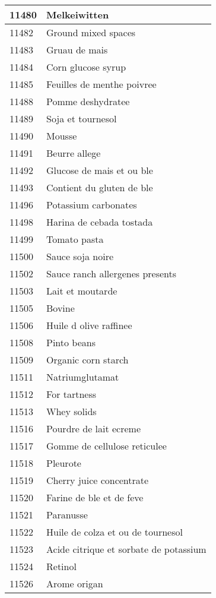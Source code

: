 \begin{longtable}{|l|l|}
11480 & Melkeiwitten \\ \hline 
11482 & Ground mixed spaces \\ \hline 
11483 & Gruau de mais \\ \hline 
11484 & Corn glucose syrup \\ \hline 
11485 & Feuilles de menthe poivree \\ \hline 
11488 & Pomme deshydratee \\ \hline 
11489 & Soja et tournesol \\ \hline 
11490 & Mousse \\ \hline 
11491 & Beurre allege \\ \hline 
11492 & Glucose de mais et ou ble \\ \hline 
11493 & Contient du gluten de ble \\ \hline 
11496 & Potassium carbonates \\ \hline 
11498 & Harina de cebada tostada \\ \hline 
11499 & Tomato pasta \\ \hline 
11500 & Sauce soja noire \\ \hline 
11502 & Sauce ranch allergenes presents \\ \hline 
11503 & Lait et moutarde \\ \hline 
11505 & Bovine \\ \hline 
11506 & Huile d olive raffinee \\ \hline 
11508 & Pinto beans \\ \hline 
11509 & Organic corn starch \\ \hline 
11511 & Natriumglutamat \\ \hline 
11512 & For tartness \\ \hline 
11513 & Whey solids \\ \hline 
11516 & Pourdre de lait ecreme \\ \hline 
11517 & Gomme de cellulose reticulee \\ \hline 
11518 & Pleurote \\ \hline 
11519 & Cherry juice concentrate \\ \hline 
11520 & Farine de ble et de feve \\ \hline 
11521 & Paranusse \\ \hline 
11522 & Huile de colza et ou de tournesol \\ \hline 
11523 & Acide citrique et sorbate de potassium \\ \hline 
11524 & Retinol \\ \hline 
11526 & Arome origan \\ \hline 

\end{longtable}
